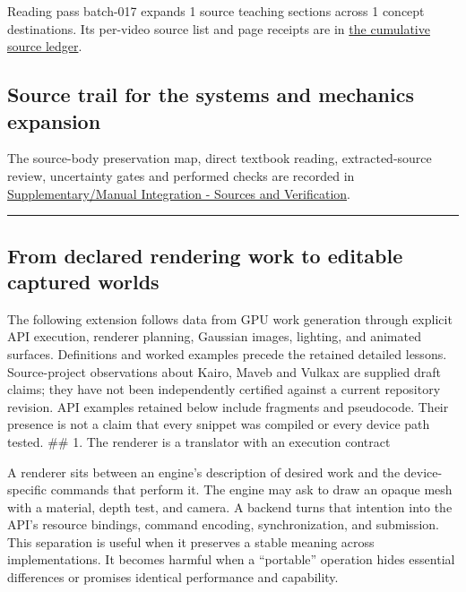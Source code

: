 Reading pass batch-017 expands 1 source teaching sections across 1 concept destinations. Its per-video source list and page receipts are in \hyperref[appendix-877738f6f4d2-batch-017-expanded-reading-and-integration]{the cumulative source ledger}.

\subsection{Source trail for the systems and mechanics expansion}\label{06-engine-ii-ch042-source-trail-for-the-systems-and-mechanics-expansion}

\hypertarget{06-engine-ii-ch042-source-trail-for-the-systems-and-mechanics-expansion}{}

The source-body preservation map, direct textbook reading, extracted-source review, uncertainty gates and performed checks are recorded in \hyperref[appendix-3b67654799a2]{Supplementary/Manual Integration - Sources and Verification}.

\begin{center}\rule{0.5\linewidth}{0.5pt}\end{center}

\subsection{From declared rendering work to editable captured worlds}\label{06-engine-ii-ch042-from-declared-rendering-work-to-editable-captured-worlds}

\hypertarget{06-engine-ii-ch042-from-declared-rendering-work-to-editable-captured-worlds}{}

The following extension follows data from GPU work generation through explicit API execution, renderer planning, Gaussian images, lighting, and animated surfaces. Definitions and worked examples precede the retained detailed lessons. Source-project observations about Kairo, Maveb and Vulkax are supplied draft claims; they have not been independently certified against a current repository revision. API examples retained below include fragments and pseudocode. Their presence is not a claim that every snippet was compiled or every device path tested. \#\# 1. The renderer is a translator with an execution contract

A renderer sits between an engine's description of desired work and the device-specific commands that perform it. The engine may ask to draw an opaque mesh with a material, depth test, and camera. A backend turns that intention into the API's resource bindings, command encoding, synchronization, and submission. This separation is useful when it preserves a stable meaning across implementations. It becomes harmful when a ``portable'' operation hides essential differences or promises identical performance and capability.

